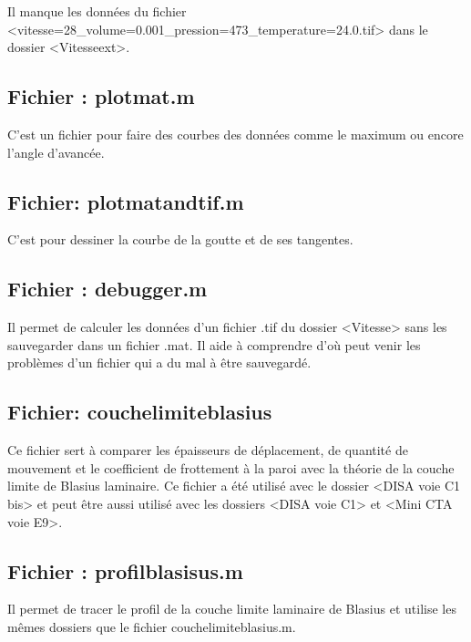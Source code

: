 \documentclass{article}
\begin{document}
Il manque les données du fichier <vitesse=28\_volume=0.001\_pression=473\_temperature=24.0.tif> dans le dossier <Vitesseext>.

\subsection{Fichier : plotmat.m}

C'est un fichier pour faire des courbes des données comme le maximum ou encore l'angle d'avancée.

\subsection{Fichier: plotmatandtif.m}
C'est pour dessiner la courbe de la goutte et de ses tangentes.

\subsection{Fichier : debugger.m}
Il permet de calculer les données d'un fichier .tif du dossier <Vitesse> sans les sauvegarder dans un fichier .mat.
Il aide à comprendre d'où peut venir les problèmes d'un fichier qui a du mal à être sauvegardé.

\subsection{Fichier: couchelimiteblasius}
Ce fichier sert à comparer les épaisseurs de déplacement, de quantité de mouvement et le coefficient de frottement à la paroi avec la théorie de la couche limite de Blasius laminaire.
Ce fichier a été utilisé avec le dossier <DISA voie C1 bis> et peut être aussi utilisé avec les dossiers <DISA voie C1> et <Mini CTA voie E9>.

\subsection{Fichier : profilblasisus.m}

Il permet de tracer le profil de la couche limite laminaire de Blasius et utilise les mêmes dossiers que le fichier couchelimiteblasius.m.
\end{document}
